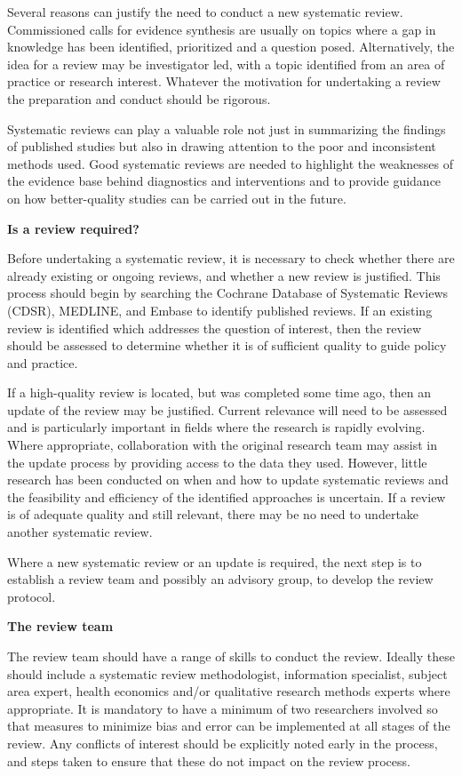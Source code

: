 \documentclass[
  11pt,
  a4paper,
  DIV=11,
  numbers=noendperiod]{scrreprt}
\begin{document}
Several reasons can justify the need to conduct a new systematic review.
Commissioned calls for evidence synthesis are usually on topics where a
gap in knowledge has been identified, prioritized and a question posed.
Alternatively, the idea for a review may be investigator led, with a
topic identified from an area of practice or research interest. Whatever
the motivation for undertaking a review the preparation and conduct
should be rigorous.

Systematic reviews can play a valuable role not just in summarizing the
findings of published studies but also in drawing attention to the poor
and inconsistent methods used. Good systematic reviews are needed to
highlight the weaknesses of the evidence base behind diagnostics and
interventions and to provide guidance on how better-quality studies can
be carried out in the future.

\textbf{Is a review required?}

Before undertaking a systematic review, it is necessary to check whether
there are already existing or ongoing reviews, and whether a new review
is justified. This process should begin by searching the Cochrane
Database of Systematic Reviews (CDSR), MEDLINE, and Embase to identify
published reviews. If an existing review is identified which addresses
the question of interest, then the review should be assessed to
determine whether it is of sufficient quality to guide policy and
practice.

If a high-quality review is located, but was completed some time ago,
then an update of the review may be justified. Current relevance will
need to be assessed and is particularly important in fields where the
research is rapidly evolving. Where appropriate, collaboration with the
original research team may assist in the update process by providing
access to the data they used. However, little research has been
conducted on when and how to update systematic reviews and the
feasibility and efficiency of the identified approaches is uncertain. If
a review is of adequate quality and still relevant, there may be no need
to undertake another systematic review.

Where a new systematic review or an update is required, the next step is
to establish a review team and possibly an advisory group, to develop
the review protocol.

\textbf{The review team}

The review team should have a range of skills to conduct the review.
Ideally these should include a systematic review methodologist,
information specialist, subject area expert, health economics and/or
qualitative research methods experts where appropriate. It is mandatory
to have a minimum of two researchers involved so that measures to
minimize bias and error can be implemented at all stages of the review.
Any conflicts of interest should be explicitly noted early in the
process, and steps taken to ensure that these do not impact on the
review process.
\end{document}
